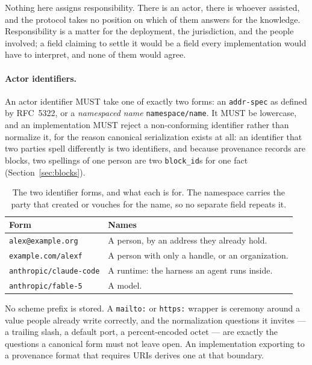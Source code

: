 \documentclass[11pt,a4paper]{article}
\begin{document}
\begin{callout}[title=One question this protocol does not ask]
Nothing here assigns responsibility. There is an actor, there is whoever
assisted, and the protocol takes no position on which of them answers for the
knowledge. Responsibility is a matter for the deployment, the jurisdiction, and
the people involved; a field claiming to settle it would be a field every
implementation would have to interpret, and none of them would agree.
\end{callout}

\paragraph{Actor identifiers.}
An actor identifier MUST take one of exactly two forms: an
\texttt{addr-spec} as defined by RFC~5322, or a \emph{namespaced name}
\texttt{namespace/name}. It MUST be lowercase, and an implementation MUST reject
a non-conforming identifier rather than normalize it, for the reason canonical
serialization exists at all: an identifier that two parties spell differently is
two identifiers, and because provenance records are blocks, two spellings of one
person are two \texttt{block\_id}s for one fact (Section~\ref{sec:blocks}).

\begin{table}[htbp]
\centering
\caption{The two identifier forms, and what each is for. The namespace carries
the party that created or vouches for the name, so no separate field repeats it.}
\label{tab:actor}
\begin{tabularx}{\textwidth}{lY}
\toprule
\textbf{Form} & \textbf{Names} \\
\midrule
\texttt{alex@example.org}        & A person, by an address they already hold. \\
\texttt{example.com/alexf}       & A person with only a handle, or an organization. \\
\texttt{anthropic/claude-code}   & A runtime: the harness an agent runs inside. \\
\texttt{anthropic/fable-5}       & A model. \\
\bottomrule
\end{tabularx}
\end{table}

No scheme prefix is stored. A \texttt{mailto:} or \texttt{https:} wrapper is
ceremony around a value people already write correctly, and the normalization
questions it invites --- a trailing slash, a default port, a percent-encoded
octet --- are exactly the questions a canonical form must not leave open. An
implementation exporting to a provenance format that requires URIs derives one
at that boundary.
\end{document}
